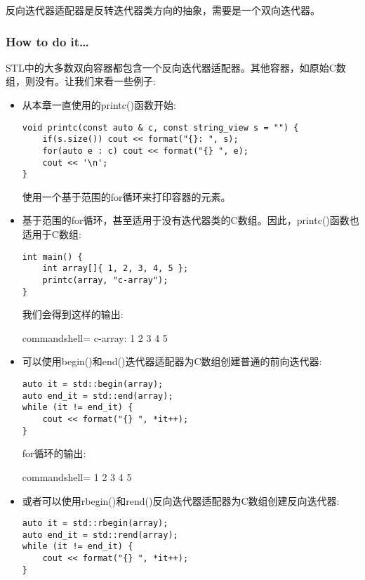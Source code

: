
反向迭代器适配器是反转迭代器类方向的抽象，需要是一个双向迭代器。

\subsubsection{How to do it…}

STL中的大多数双向容器都包含一个反向迭代器适配器。其他容器，如原始C数组，则没有。让我们来看一些例子:

\begin{itemize}
\item 
从本章一直使用的printc()函数开始:

\begin{lstlisting}[style=styleCXX]
void printc(const auto & c, const string_view s = "") {
	if(s.size()) cout << format("{}: ", s);
	for(auto e : c) cout << format("{} ", e);
	cout << '\n';
}
\end{lstlisting}

使用一个基于范围的for循环来打印容器的元素。

\item 
基于范围的for循环，甚至适用于没有迭代器类的C数组。因此，printc()函数也适用于C数组:

\begin{lstlisting}[style=styleCXX]
int main() {
	int array[]{ 1, 2, 3, 4, 5 };
	printc(array, "c-array");
}
\end{lstlisting}

我们会得到这样的输出:

\begin{tcblisting}{commandshell={}}
c-array: 1 2 3 4 5
\end{tcblisting}

\item 
可以使用begin()和end()迭代器适配器为C数组创建普通的前向迭代器:

\begin{lstlisting}[style=styleCXX]
auto it = std::begin(array);
auto end_it = std::end(array);
while (it != end_it) {
	cout << format("{} ", *it++);
}
\end{lstlisting}

for循环的输出:

\begin{tcblisting}{commandshell={}}
1 2 3 4 5
\end{tcblisting}

\item 
或者可以使用rbegin()和rend()反向迭代器适配器为C数组创建反向迭代器:

\begin{lstlisting}[style=styleCXX]
auto it = std::rbegin(array);
auto end_it = std::rend(array);
while (it != end_it) {
	cout << format("{} ", *it++);
}
\end{lstlisting}


\end{itemize}
